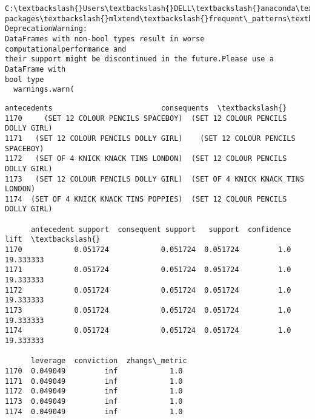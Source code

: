 \documentclass[11pt]{article}
\begin{document}
    \begin{Verbatim}[commandchars=\\\{\}]
C:\textbackslash{}Users\textbackslash{}DELL\textbackslash{}anaconda\textbackslash{}envs\textbackslash{}AIDM\textbackslash{}lib\textbackslash{}site-
packages\textbackslash{}mlxtend\textbackslash{}frequent\_patterns\textbackslash{}fpcommon.py:110: DeprecationWarning:
DataFrames with non-bool types result in worse computationalperformance and
their support might be discontinued in the future.Please use a DataFrame with
bool type
  warnings.warn(
    \end{Verbatim}

    \begin{Verbatim}[commandchars=\\\{\}]
                              antecedents                         consequents  \textbackslash{}
1170     (SET 12 COLOUR PENCILS SPACEBOY)  (SET 12 COLOUR PENCILS DOLLY GIRL)
1171   (SET 12 COLOUR PENCILS DOLLY GIRL)    (SET 12 COLOUR PENCILS SPACEBOY)
1172   (SET OF 4 KNICK KNACK TINS LONDON)  (SET 12 COLOUR PENCILS DOLLY GIRL)
1173   (SET 12 COLOUR PENCILS DOLLY GIRL)  (SET OF 4 KNICK KNACK TINS LONDON)
1174  (SET OF 4 KNICK KNACK TINS POPPIES)  (SET 12 COLOUR PENCILS DOLLY GIRL)

      antecedent support  consequent support   support  confidence       lift  \textbackslash{}
1170            0.051724            0.051724  0.051724         1.0  19.333333
1171            0.051724            0.051724  0.051724         1.0  19.333333
1172            0.051724            0.051724  0.051724         1.0  19.333333
1173            0.051724            0.051724  0.051724         1.0  19.333333
1174            0.051724            0.051724  0.051724         1.0  19.333333

      leverage  conviction  zhangs\_metric
1170  0.049049         inf            1.0
1171  0.049049         inf            1.0
1172  0.049049         inf            1.0
1173  0.049049         inf            1.0
1174  0.049049         inf            1.0
    \end{Verbatim}
\end{document}
